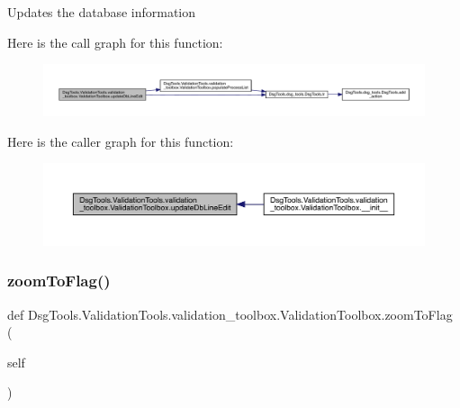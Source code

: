 \begin{DoxyVerb}Updates the database information
\end{DoxyVerb}
 Here is the call graph for this function\+:
\nopagebreak
\begin{figure}[H]
\begin{center}
\leavevmode
\includegraphics[width=350pt]{class_dsg_tools_1_1_validation_tools_1_1validation__toolbox_1_1_validation_toolbox_a985173fe2285c3894ab3800d94e10fd0_cgraph}
\end{center}
\end{figure}
Here is the caller graph for this function\+:
\nopagebreak
\begin{figure}[H]
\begin{center}
\leavevmode
\includegraphics[width=350pt]{class_dsg_tools_1_1_validation_tools_1_1validation__toolbox_1_1_validation_toolbox_a985173fe2285c3894ab3800d94e10fd0_icgraph}
\end{center}
\end{figure}
\mbox{\label{class_dsg_tools_1_1_validation_tools_1_1validation__toolbox_1_1_validation_toolbox_a52675cb46cbc4393a3fc4bbbef3cbc0e}} 
\subsubsection{\texorpdfstring{zoom\+To\+Flag()}{zoomToFlag()}}
{\footnotesize\ttfamily def Dsg\+Tools.\+Validation\+Tools.\+validation\+\_\+toolbox.\+Validation\+Toolbox.\+zoom\+To\+Flag (\begin{DoxyParamCaption}\item[{}]{self }\end{DoxyParamCaption})}

